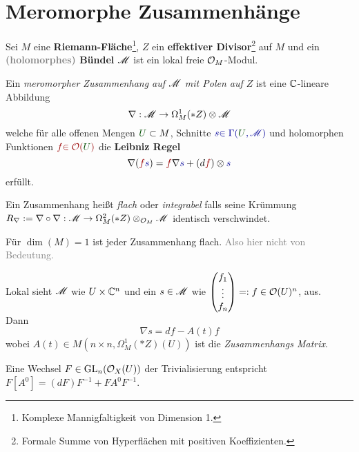 \section{Meromorphe Zusammenhänge} %
Sei $M$ eine \textbf{Riemann-Fläche}\footnote{Komplexe Mannigfaltigkeit von
Dimension 1.}, $Z$ ein \textbf{effektiver Divisor}\footnote{Formale Summe von
Hyperflächen mit positiven Koeffizienten.} auf $M$ und ein
\textbf{\textcolor{gray}{(holomorphes)} Bündel} $\mathscr{M}$ ist ein lokal freie
$\mathcal{O}_M$-Modul.
\begin{defn}
  \def\myU{\textcolor{green!30!black}{U}}
  \def\mys{\textcolor{blue!60!black}{s}}
  \def\myf{\textcolor{red!60!black}{f}}
  Ein \emph{meromorpher Zusammenhang auf $\mathscr{M}$ mit Polen auf $Z$}
  ist eine $\mathbb{C}$-lineare Abbildung
  \[
    \nabla:\mathscr{M}\to\Omega_M^1(*Z)\otimes\mathscr{M}
  \]
  welche für alle offenen Mengen $\myU\subset M$, Schnitte
  $\mys\textcolor{blue!60!black}{\in\Gamma(\myU,\sM)}$ und holomorphen
  Funktionen $\myf\textcolor{red!60!black}{\in\cO(\myU)}$ die \textbf{Leibniz
  Regel}
  \[
    \nabla(\myf\mys)=\myf\nabla\mys+(d\myf)\otimes\mys
  \]
  erfüllt.

  \begin{defn}
    Ein Zusammenhang heißt \emph{flach} oder \emph{integrabel} falls
        seine Krümmung
    $R_\nabla:=\nabla\circ\nabla:\mathscr{M}\to\Omega_M^2(*Z)\otimes_{\mathcal{O}_M}\mathscr{M}$
    identisch verschwindet.\marginnote{\textcolor{gray}{$R_\nabla\equiv0$}}
    \begin{rem}
      Für $\dim(M)=1$ ist jeder Zusammenhang flach.
      \textcolor{gray}{Also hier nicht von Bedeutung.}
    \end{rem}
  \end{defn}
\end{defn}
\begin{rem}
  Lokal sieht $\mathscr{M}$ wie $U\times\mathbb{C}^n$ und ein $s\in\mathscr{M}$ wie
  $\begin{pmatrix}f_{1}\\\vdots\\f_{n}\end{pmatrix}=:f\in\mathcal{O}(U)^n$, aus.
  \\Dann
  \[
    \nabla s=df - A(t)f
  \]
  wobei $A(t)\in M(n\times n,\Omega_M^1(*Z)(U))$ ist die \emph{Zusammenhangs
  Matrix}.
  \begin{comment}
    Klassifiziere diese durch die Lösung der DGL $\nabla s=0$.
  \end{comment}
  Eine Wechsel $F\in\operatorname{GL}_n(\mathcal{O}_X(U))$ der Trivialisierung entspricht 
  $F[A^0]=(dF)F^{-1}+FA^0F^{-1}$.
  \begin{comment}
    $G\{t\}:=\GL_n(\C\{t\})$ wirkt auf Zsh. Matrizen durch
    $F[A^0]=(dF)F^{-1}+FA^0F^{-1}$.
  \end{comment}
\end{rem}
